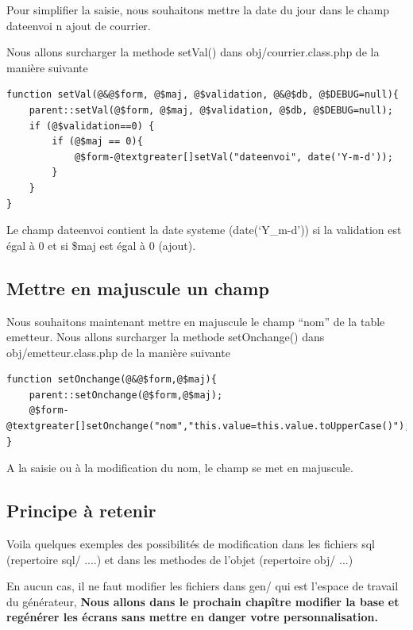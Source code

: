 \documentclass[letterpaper,10pt,french]{manual}
\begin{document}
Pour simplifier la saisie, nous souhaitons mettre la date du jour dans le
champ dateenvoi n ajout de courrier.

Nous allons surcharger la methode setVal() dans obj/courrier.class.php
de la manière suivante

\begin{Verbatim}[commandchars=@\[\]]
function setVal(@&@$form, @$maj, @$validation, @&@$db, @$DEBUG=null){
    parent::setVal(@$form, @$maj, @$validation, @$db, @$DEBUG=null);
    if (@$validation==0) {
        if (@$maj == 0){
            @$form-@textgreater[]setVal("dateenvoi", date('Y-m-d'));
        }
    }
}
\end{Verbatim}

Le champ dateenvoi contient la date systeme (date(`Y\_m-d')) si la validation est égal à 0
et si \$maj est égal à 0 (ajout).


\subsection{Mettre en majuscule un champ}

Nous souhaitons maintenant mettre en majuscule le champ ``nom'' de la table emetteur.
Nous allons surcharger la methode setOnchange() dans
obj/emetteur.class.php de la manière suivante

\begin{Verbatim}[commandchars=@\[\]]
function setOnchange(@&@$form,@$maj){
    parent::setOnchange(@$form,@$maj);
    @$form-@textgreater[]setOnchange("nom","this.value=this.value.toUpperCase()");
}
\end{Verbatim}

A la saisie ou à la modification du nom, le champ se met en majuscule.


\subsection{Principe à retenir}

Voila quelques exemples des possibilités de modification dans les fichiers sql
(repertoire sql/ ....) et dans les methodes de l'objet (repertoire obj/ ...)

En aucun cas, il ne faut modifier les fichiers dans gen/ qui est l'espace de travail du générateur,
\textbf{Nous allons dans le prochain chapître modifier la base et  regénérer les écrans sans mettre en danger
votre personnalisation.}

\resetcurrentobjects
\hypertarget{--doc-utilisation/modifier_base}{}
\end{document}
